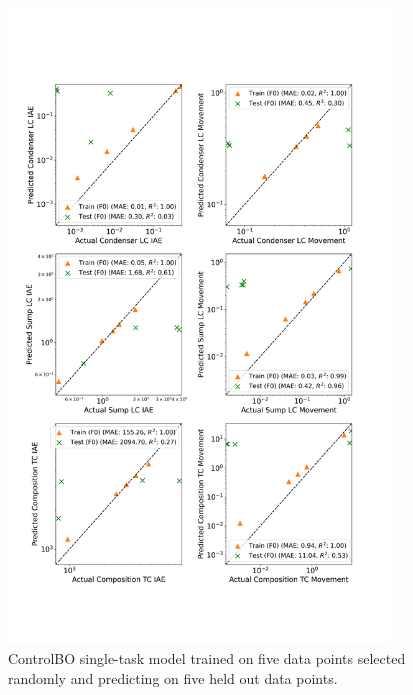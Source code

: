 \begin{figure}
    \centering
    \includegraphics[width=0.9\textwidth]{gfx/Appendix/parity_plot_singletask.png}
    \caption{ControlBO single-task model trained on five data points selected randomly and  predicting on five held out data points.}
    \label{fig:st_parity_plot_controlbo}
\end{figure}

